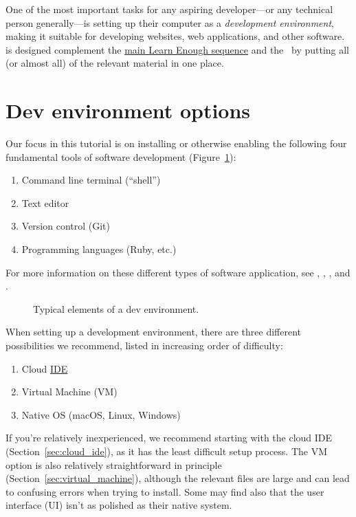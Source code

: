 One of the most important tasks for any aspiring developer---or any technical person generally---is setting up their computer as a \emph{development environment}, making it suitable for developing websites, web applications, and other software. \ledev is designed complement the \href{#}{main Learn Enough sequence} and the \rort\ by putting all (or almost all) of the relevant material in one place.

\section{Dev environment options} %
\label{sec:dev_environment_options}

Our focus in this tutorial is on installing or otherwise enabling the following four fundamental tools of software development (Figure~\ref{fig:dev_environment}):
\begin{enumerate}
  \item Command line terminal (``shell'')
  \item Text editor
  \item Version control (Git)
  \item Programming languages (Ruby, etc.)
\end{enumerate}
For more information on these different types of software application, see \lecl, , \leg, and \ler.

\begin{figure}
\begin{center}
\end{center}
\caption{Typical elements of a dev environment.\label{fig:dev_environment}}
\end{figure}

When setting up a development environment, there are three different possibilities we recommend, listed in increasing order of difficulty:

\begin{enumerate}
  \item Cloud \href{https://en.wikipedia.org/wiki/Integrated_development_environment}{IDE}
  \item Virtual Machine (VM)
  \item Native OS (macOS, Linux, Windows)
\end{enumerate}

If you're relatively inexperienced, we recommend starting with the cloud IDE (Section~\ref{sec:cloud_ide}), as it has the least difficult setup process. The VM option is also relatively straightforward in principle (Section~\ref{sec:virtual_machine}), although the relevant files are large and can lead to confusing errors when trying to install. Some may find also that the user interface (UI) isn't as polished as their native system.

